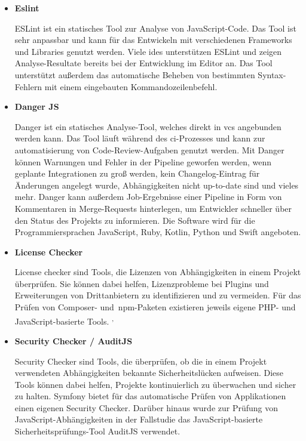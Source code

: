 \begin{itemize}
    \item {
        \textbf{Eslint}\par
        ESLint ist ein statisches Tool zur Analyse von JavaScript-Code.
        Das Tool ist sehr anpassbar und kann für das Entwickeln mit verschiedenen Frameworks und Libraries genutzt
        werden.
        Viele \acrshort{ide}s unterstützen ESLint und zeigen Analyse-Resultate bereits bei der Entwicklung im Editor
        an.
        Das Tool unterstützt außerdem das automatische Beheben von bestimmten Syntax-Fehlern mit einem eingebauten
        Kommandozeilenbefehl.
    }

    \item {
        \textbf{Danger JS}\par
        Danger ist ein statisches Analyse-Tool, welches direkt in \acrshort{vcs} angebunden werden kann.
        Das Tool läuft während des \acrshort{ci}-Prozesses und kann zur automatisierung von Code-Review-Aufgaben
        genutzt werden.
        Mit Danger können Warnungen und Fehler in der Pipeline geworfen werden, wenn geplante Integrationen zu
        groß werden, kein Changelog-Eintrag für Änderungen angelegt wurde, Abhängigkeiten nicht up-to-date sind und
        vieles mehr.
        Danger kann außerdem Job-Ergebnisse einer Pipeline in Form von Kommentaren in Merge-Requests hinterlegen,
        um Entwickler schneller über den Status des Projekts zu informieren.
        Die Software wird für die Programmiersprachen JavaScript, Ruby, Kotlin, Python und Swift angeboten.
    }

    \item {
        \textbf{License Checker}\par
        License checker sind Tools, die Lizenzen von Abhängigkeiten in einem Projekt überprüfen.
        Sie können dabei helfen, Lizenzprobleme bei Plugins und Erweiterungen von Drittanbietern zu identifizieren
        und zu vermeiden.
        Für das Prüfen von Composer- und\ \acrshort{npm}-Paketen existieren jeweils eigene PHP- und JavaScript-basierte
        Tools.
        \textsuperscript{,\ }
    }

    \item {
        \textbf{Security Checker / AuditJS}\par
        Security Checker sind Tools, die überprüfen, ob die in einem Projekt verwendeten Abhängigkeiten bekannte
        Sicherheitslücken aufweisen.
        Diese Tools können dabei helfen, Projekte kontinuierlich zu überwachen und sicher zu halten.
        Symfony bietet für das automatische Prüfen von Applikationen einen eigenen Security Checker.
        Darüber hinaus wurde zur Prüfung von JavaScript-Abhängigkeiten in der Fallstudie das JavaScript-basierte
        Sicherheitsprüfungs-Tool AuditJS verwendet.
    }
\end{itemize}


